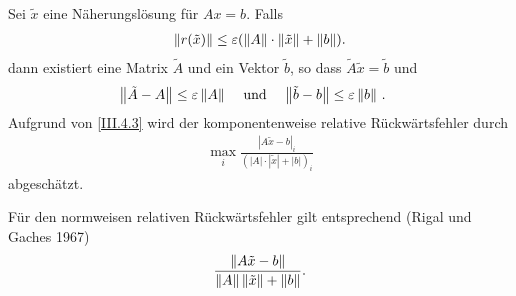\begin{Satze}\label{3.4.1}
  Sei $\tilde{x}$ eine Näherungslösung für $Ax= b$. Falls
  \begin{gather}\label{III.4.3}
    \nn[r(\tilde{x})]\leq\varepsilon(\nn[A]\cdot\nn[\tilde{x}]+\nn[b]).
  \end{gather}
  dann existiert eine Matrix $\tilde{ A}$  und ein
  Vektor $\tilde { b}$, so dass $\tilde{A}\tilde{x}=\tilde{b}$ und
  \begin{align}
    \nn[\tilde{A}-A]&\leq\varepsilon\nn[A]
    &\text{ und }&
    &\nn[\tilde{b}-b]&\leq \varepsilon \nn[b]\,.
                       \label{III.4.4}
  \end{align}
  Aufgrund von \eqref{III.4.3} wird der komponentenweise relative
  Rückwärtsfehler durch 
  \begin{gather*}
    \max_i \frac{| A \tilde{ x} -  b|_i}
    { (| A|\cdot |\tilde{x}| + |b|)_i} 
  \end{gather*}
  abgeschätzt.
  
  Für den normweisen relativen Rückwärtsfehler gilt entsprechend
  (Rigal und Gaches 1967)
  \begin{gather*}
    \frac{\nn[A \tilde{x} -  b]}
    { \nn[A] \nn[\tilde{x}] + \nn[b] } .
  \end{gather*}
\end{Satze}


